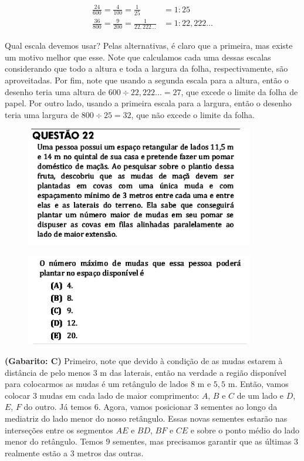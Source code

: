 \documentclass[a4paper]{article}
\begin{document}
\begin{align*}
\frac{24}{600} = \frac{4}{100} = \frac{1}{25} &= 1:25 \\
\frac{36}{800} = \frac{9}{200} = \frac{1}{22,222...} &= 1:22,222...
\end{align*}
\par\vspace{0.3cm} Qual escala devemos usar? Pelas alternativas, é claro que a primeira, mas existe um motivo melhor que esse. Note que calculamos cada uma dessas escalas considerando que todo a altura e toda a largura da folha, respectivamente, são aproveitadas. Por fim, note que usando a segunda escala para a altura, então o desenho teria uma altura de $600\div 22,222... = 27$, que excede o limite da folha de papel. Por outro lado, usando a primeira escala para a largura, então o desenho teria uma largura de $800\div25 = 32$, que não excede o limite da folha.
\begin{figure}[H]
	\begin{center}
		\includegraphics[width=10cm]{L5Q22_1.png}
	\end{center}
\end{figure} 
\begin{figure}[H]
	\begin{center}
		\includegraphics[width=10cm]{L5Q22_2.png}
	\end{center}
\end{figure}
\par\textbf{(Gabarito: C)} Primeiro, note que devido à condição de as mudas estarem à distância de pelo menos $3$ m das laterais, então na verdade a região disponível para colocarmos as mudas é um retângulo de lados $8$ m e $5,5$ m. Então, vamos colocar $3$ mudas em cada lado de maior comprimento: $A$, $B$ e $C$ de um lado e $D$, $E$, $F$ do outro. Já temos $6$. Agora, vamos posicionar $3$ sementes ao longo da mediatriz do lado menor do nosso retângulo. Essas novas sementes estarão nas interseções entre os segmentos $AE$ e $BD$, $BF$ e $CE$ e sobre o ponto médio do lado menor do retângulo. Temos $9$ sementes, mas precisamos garantir que as últimas $3$ realmente estão a $3$ metros das outras.
\end{document}
